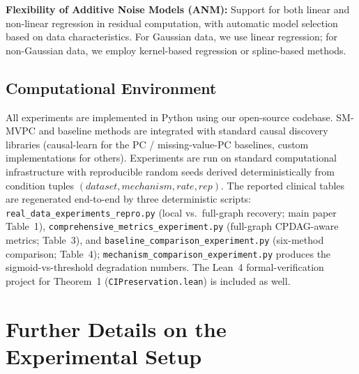 \documentclass[runningheads]{llncs}
\begin{document}
\textbf{Flexibility of Additive Noise Models  (ANM):} Support for both linear and non-linear regression in residual computation, with automatic model selection based on data characteristics. For Gaussian data, we use linear regression; for non-Gaussian data, we employ kernel-based regression or spline-based methods.

\subsection{Computational Environment}

All experiments are implemented in Python using our open-source codebase. SM-MVPC and baseline methods are integrated with standard causal discovery libraries (causal-learn for the PC / missing-value-PC baselines, custom implementations for others). Experiments are run on standard computational infrastructure with reproducible random seeds derived deterministically from condition tuples $(dataset, mechanism, rate, rep)$. The reported clinical tables are regenerated end-to-end by three deterministic scripts: \texttt{real\_data\_experiments\_repro.py} (local vs.\ full-graph recovery; main paper Table~1), \texttt{comprehensive\_metrics\_experiment.py} (full-graph CPDAG-aware metrics; Table~3), and \texttt{baseline\_comparison\_experiment.py} (six-method comparison; Table~4); \texttt{mechanism\_comparison\_experiment.py} produces the sigmoid-vs-threshold degradation numbers. The Lean~4 formal-verification project for Theorem~1 (\texttt{CIPreservation.lean}) is included as well.

\section{Further Details on the Experimental Setup}
\end{document}
